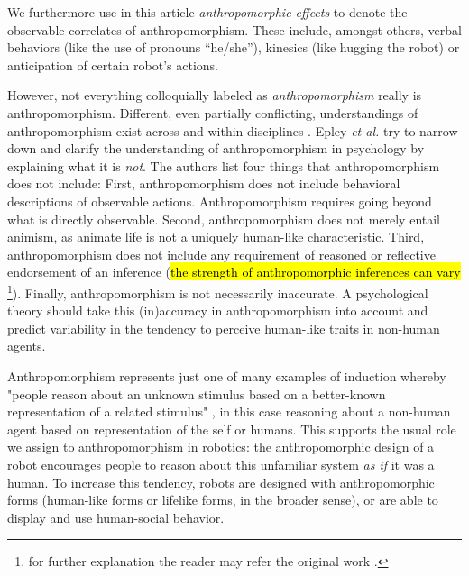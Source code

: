 \documentclass[lettersize, apacite, twoside, HRI]{apa_HRI}
\begin{document}
We furthermore use in this article \emph{anthropomorphic effects} to denote the
observable correlates of anthropomorphism. These include, amongst others,
verbal behaviors (like the use of pronouns ``he/she''), kinesics (like hugging
the robot) or anticipation of certain robot's actions.


However, not everything colloquially labeled as \emph{anthropomorphism} really is anthropomorphism. Different, even partially conflicting, understandings of anthropomorphism exist across and within disciplines \cite{duffy_anthropomorphism_2002}. Epley \textit{et al.} \cite{epley_when_2008} try to narrow down and clarify the understanding of anthropomorphism in psychology by explaining what it is \textit{not}. The authors list four things that anthropomorphism does not include: First, anthropomorphism does not include behavioral descriptions of observable actions. Anthropomorphism requires going beyond what is directly observable. Second, anthropomorphism does not merely entail animism, as animate life is not a uniquely human-like characteristic. Third, anthropomorphism does not include any requirement of reasoned or reflective endorsement of an inference (\hl{the strength of anthropomorphic inferences can vary} \footnote{for further explanation the reader may refer the original work \cite{epley_when_2008}.}).	Finally, anthropomorphism is not necessarily inaccurate. A psychological theory should take this (in)accuracy in anthropomorphism into account and predict variability in the tendency to perceive human-like traits in non-human agents.
	 


Anthropomorphism represents just one of many examples of induction whereby "people reason about an unknown stimulus based on a better-known representation of a related stimulus" \cite{epley_when_2008}, in this case reasoning about a non-human agent based on representation of the self or humans. This supports the usual role we assign to anthropomorphism in robotics: the anthropomorphic design of a robot encourages people to reason about this unfamiliar system \emph{as if} it was a human. To increase this tendency, robots are designed with anthropomorphic forms (human-like forms or lifelike forms, in the broader sense), or are able to display and use human-social behavior.
	
	
\end{document}
